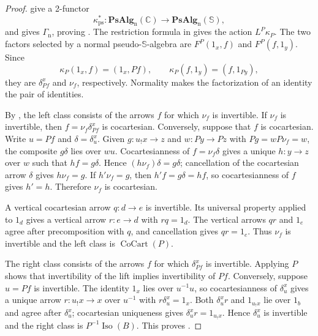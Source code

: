 \documentclass[11pt]{article}
\theoremstyle{plain}
\theoremstyle{definition}
\theoremstyle{remark}
\newcommand{\PsAlg}{\mathbf{PsAlg}}
\newcommand{\CoCart}{\operatorname{CoCart}}
\newcommand{\Iso}{\operatorname{Iso}}
\newcommand{\C}{\mathbb{C}}
\newcommand{\Sq}{\mathbb{S}}
\numberwithin{equation}{section}
\begin{document}
\begin{proof}
give a 2-functor
\begin{equation*}
  \kappa^*_{\mathrm{ps}}\colon
  \PsAlg_{\mathrm n}(\C)\longrightarrow
  \PsAlg_{\mathrm n}(\Sq),
\end{equation*}
and  gives $\Gamma_{\mathrm n}$, proving
.  The restriction formula in
 gives the action $L^P\kappa_P$.  The two factors selected
by a normal pseudo-$\Sq$-algebra are
$F^P(1_x,f)$ and $F^P(f,1_y)$.  Since
\begin{equation*}
  \kappa_P(1_x,f)=(1_x,Pf),
  \qquad
  \kappa_P(f,1_y)=(f,1_{Py}),
\end{equation*}
they are $\delta^x_{Pf}$ and $\nu_f$, respectively.  Normality makes
the factorization of an identity the pair of identities.

By , the left class consists of the arrows $f$
for which $\nu_f$ is invertible.  If $\nu_f$ is invertible, then
$f=\nu_f\delta^x_{Pf}$ is cocartesian.  Conversely, suppose that $f$
is cocartesian.  Write $u=Pf$ and $\delta=\delta^x_u$.  Given
$g\colon u_!x\to z$ and $w\colon Py\to Pz$ with
$Pg=wP\nu_f=w$, the composite $g\delta$ lies over $wu$.
Cocartesianness of $f=\nu_f\delta$ gives a unique
$h\colon y\to z$ over $w$ such that $hf=g\delta$.  Hence
$(h\nu_f)\delta=g\delta$; cancellation of the cocartesian arrow
$\delta$ gives $h\nu_f=g$.  If $h'\nu_f=g$, then
$h'f=g\delta=hf$, so cocartesianness of $f$ gives $h'=h$.
Therefore $\nu_f$ is cocartesian.

A vertical cocartesian arrow $q\colon d\to e$ is invertible.  Its
universal property applied to $1_d$ gives a vertical arrow
$r\colon e\to d$ with $rq=1_d$.  The vertical arrows $qr$ and $1_e$
agree after precomposition with $q$, and cancellation gives
$qr=1_e$.  Thus $\nu_f$ is invertible and the left class is
$\CoCart(P)$.

The right class consists of the arrows $f$ for which
$\delta^x_{Pf}$ is invertible.  Applying $P$ shows that invertibility
of the lift implies invertibility of $Pf$.  Conversely, suppose
$u=Pf$ is invertible.  The identity $1_x$ lies over $u^{-1}u$, so
cocartesianness of $\delta^x_u$ gives a unique arrow
$r\colon u_!x\to x$ over $u^{-1}$ with
$r\delta^x_u=1_x$.  Both $\delta^x_ur$ and $1_{u_!x}$ lie over
$1_b$ and agree after $\delta^x_u$; cocartesian uniqueness gives
$\delta^x_ur=1_{u_!x}$.  Hence $\delta^x_u$ is invertible and the
right class is $P^{-1}\Iso(B)$.  This proves
.


\end{proof}
\end{document}
